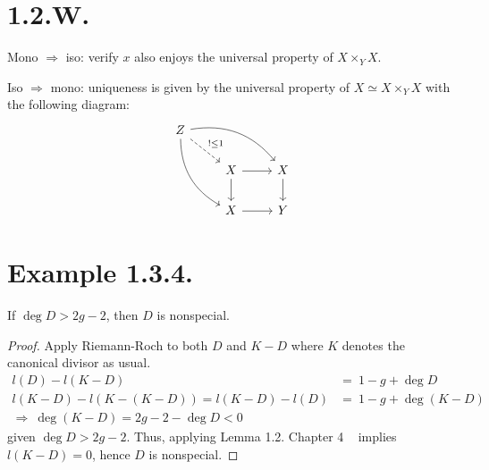 \section{1.2.W.}

Mono $\Rightarrow$ iso: verify $x$ also enjoys the universal property of $X\times_Y X$. 

Iso $\Rightarrow$ mono: uniqueness is given by the universal property of $X\simeq X\times_Y X$ with the following diagram:
\[%
\begin{tikzcd}
Z \arrow[rdd, bend right] \arrow[rrd, bend left] \arrow[rd, "!\leq 1", dashed] &                       &             \\
                                                                               & X \arrow[r] \arrow[d] & X \arrow[d] \\
                                                                               & X \arrow[r]           & Y          
\end{tikzcd}\]

\section{Example 1.3.4.}

\begin{proposition}
    If $\deg D>2g-2$, then $D$ is nonspecial.
\end{proposition}
\begin{proof}
    Apply Riemann-Roch to both $D$ and $K-D$ where $K$ denotes the canonical divisor as usual. 
    \begin{align*}
        l(D)-l(K-D) &=~ 1-g+\deg D\\
        l(K-D)-l(K-(K-D))=l(K-D)-l(D) &=~ 1-g+\deg(K-D)\\
        \Rightarrow~ \deg(K-D) = 2g-2-\deg D < 0
    \end{align*}given $\deg D>2g-2$. Thus, applying Lemma 1.2. Chapter 4 ~\cite{hartshorne2013algebraic} implies $l(K-D)=0$, hence $D$ is nonspecial.
\end{proof}